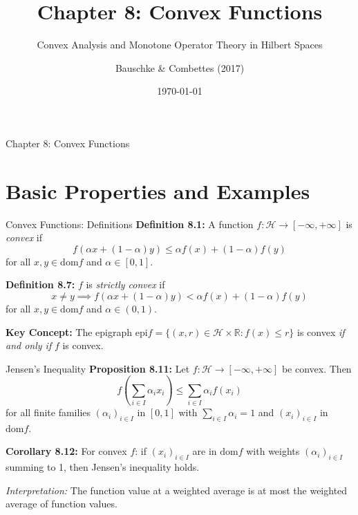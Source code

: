 \documentclass[aspectratio=169,10pt]{beamer}
\title{Chapter 8: Convex Functions}
\subtitle{Convex Analysis and Monotone Operator Theory in Hilbert Spaces}
\author{Bauschke \& Combettes (2017)}
\date{\today}
\begin{document}
\frame{\titlepage}


\begin{frame}[fragile]{Chapter 8: Convex Functions}
    \tableofcontents
\end{frame}


\section{Basic Properties and Examples}

\begin{frame}[fragile]{Convex Functions: Definitions}
    \textbf{Definition 8.1:} A function $f : \mathcal{H} \to [-\infty, +\infty]$ is \textit{convex} if
    \[
    f(\alpha x + (1-\alpha) y) \leq \alpha f(x) + (1-\alpha) f(y)
    \]
    for all $x, y \in \text{dom} f$ and $\alpha \in [0,1]$.

    \vspace{0.3cm}

    \textbf{Definition 8.7:} $f$ is \textit{strictly convex} if
    \[
    x \neq y \implies f(\alpha x + (1-\alpha) y) < \alpha f(x) + (1-\alpha) f(y)
    \]
    for all $x, y \in \text{dom} f$ and $\alpha \in (0,1)$.

    \vspace{0.3cm}

    \textbf{Key Concept:} The epigraph $\text{epi} f = \{(x,r) \in \mathcal{H} \times \mathbb{R} : f(x) \leq r\}$ 
    is convex \textit{if and only if} $f$ is convex.
\end{frame}

\begin{frame}[fragile]{Jensen's Inequality}
    \textbf{Proposition 8.11:} Let $f : \mathcal{H} \to [-\infty, +\infty]$ be convex. Then
    \[
    f\left(\sum_{i \in I} \alpha_i x_i\right) \leq \sum_{i \in I} \alpha_i f(x_i)
    \]
    for all finite families $(\alpha_i)_{i \in I}$ in $[0,1]$ with $\sum_{i \in I} \alpha_i = 1$ and $(x_i)_{i \in I}$ in $\text{dom} f$.

    \vspace{0.3cm}

    \textbf{Corollary 8.12:} For convex $f$: if $(x_i)_{i \in I}$ are in $\text{dom} f$ with weights $(\alpha_i)_{i \in I}$ 
    summing to 1, then Jensen's inequality holds.

    \vspace{0.3cm}

    \textit{Interpretation:} The function value at a weighted average is at most the weighted average of function values.
\end{frame}
\end{document}
